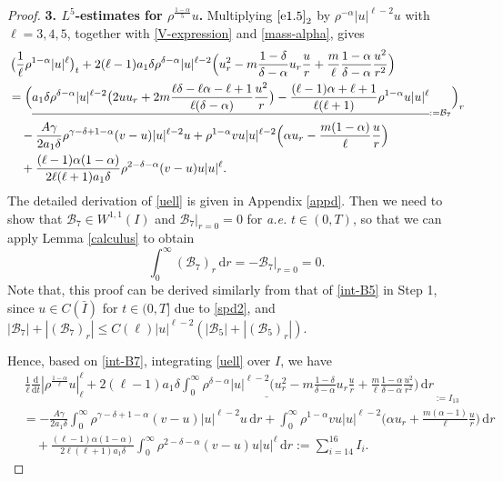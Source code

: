 \documentclass[11pt,reqno]{amsart}
\numberwithin{rk}{section}
\numberwithin{prop}{section}
\numberwithin{mydef}{section}
\numberwithin{lem}{section}
\numberwithin{equation}{section}
\numberwithin{thm}{section}
\begin{document}
\begin{proof}
\smallskip
\textbf{3. $L^5$-estimates for $\rho^\frac{1-\alpha}{5}u$.} Multiplying $\eqref{e1.5}_2$ by $\rho^{-\alpha}|u|^{\ell-2}u$ with $\ell=3,4,5$, together with \eqref{V-expression} and \eqref{mass-alpha}, gives
\begin{align}
&\,\big(\frac{1}{\ell}\rho^{1-\alpha}|u|^\ell\big)_t+2(\ell-1)a_1\delta\rho^{\delta-\alpha}|u|^{\ell-2}\Big(u_r^2-m\frac{1-\delta}{\delta-\alpha}u_r\frac{u}{r}+\frac{m}{\ell}\frac{1-\alpha}{\delta-\alpha}\frac{u^2}{r^2}\Big)\notag\\
&=\Big(\underline{a_1\delta\rho^{\delta-\alpha}|u|^{\ell-2}\big(2uu_r+2m\frac{\ell\delta-\ell\alpha- \ell+1}{\ell(\delta-\alpha)}\frac{u^{2}}{r}\big) -\frac{(\ell-1)\alpha+\ell+1}{\ell(\ell+1)}\rho^{1-\alpha}u|u|^\ell}_{:=\mathcal{B}_7}\Big)_r\label{uell}\\
&\quad -\frac{A\gamma}{2a_1\delta}\rho^{\gamma-\delta+1-\alpha}(v-u)|u|^{\ell-2}u+\rho^{1-\alpha}vu|u|^{\ell-2}\Big(\alpha u_r-\frac{m(1-\alpha)}{\ell}\frac{u}{r}\Big)\notag\\
&\quad +\frac{(\ell-1)\alpha(1-\alpha)}{2\ell(\ell+1)a_1\delta}\rho^{2-\delta-\alpha}(v-u)u|u|^{\ell}.\notag
\end{align}
The detailed derivation of \eqref{uell} is given in Appendix \ref{appd}. Then we need to show that $\mathcal{B}_7\in W^{1,1}(I)$ and $\mathcal{B}_7|_{r=0}=0$ for \textit{a.e.} $t\in(0,T)$, so that we can apply Lemma \ref{calculus} to obtain
\begin{equation}\label{int-B7}
\int_0^\infty (\mathcal{B}_7)_r\,\mathrm{d}r=-\mathcal{B}_7|_{r=0}=0.
\end{equation}
Note that, this proof can be derived similarly from that of \eqref{int-B5} in Step 1, since $u\in C(\bar I)$ for $t\in (0,T]$ due to \eqref{spd2}, and  $|\mathcal{B}_7|+|(\mathcal{B}_7)_r|\leq C(\ell)|u|^{\ell-2}(|\mathcal{B}_5|+|(\mathcal{B}_5)_r|)$.

Hence, based on \eqref{int-B7}, integrating \eqref{uell} over $I$, we have
\begin{equation}\label{6.3}
\begin{aligned}
&\,\frac{1}{\ell}\frac{\mathrm{d}}{\mathrm{d}t}|\rho^\frac{1-\alpha}{\ell}u|_\ell^\ell+ \underline{2(\ell-1)a_1\delta\int_0^\infty\rho^{\delta-\alpha}|u|^{\ell-2}\Big(u_r^2-m\frac{1-\delta}{\delta-\alpha}u_r\frac{u}{r}+\frac{m}{\ell}\frac{1-\alpha}{\delta-\alpha}\frac{u^2}{r^2}\Big)\,\mathrm{d}r}_{:=I_{13}}\\
&=-\frac{A\gamma}{2a_1\delta}\int_0^\infty\rho^{\gamma-\delta+1-\alpha}(v-u)|u|^{\ell-2}u\,\mathrm{d}r+\int_0^\infty\rho^{1-\alpha}vu|u|^{\ell-2}\Big(\alpha u_r+\frac{m(\alpha-1)}{\ell}\frac{u}{r}\Big)\,\mathrm{d}r\\
&\quad+\frac{(\ell-1)\alpha(1-\alpha)}{2\ell(\ell+1)a_1\delta}\int_0^\infty\rho^{2-\delta-\alpha}(v-u)u|u|^{\ell}\,\mathrm{d}r:=\sum_{i=14}^{16}I_i.
\end{aligned}
\end{equation}


\end{proof}
\end{document}
